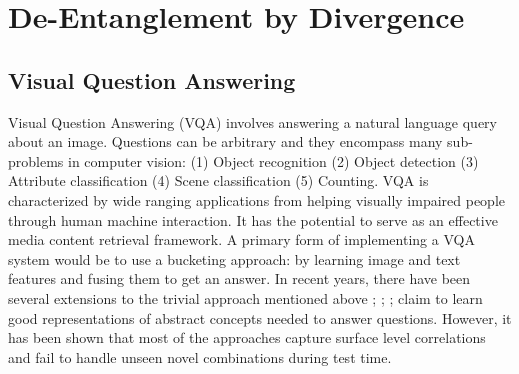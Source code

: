 \chapter{De-Entanglement by Divergence}

\section{Visual Question Answering}

Visual Question Answering (VQA) involves answering a natural language query about an image. Questions can be arbitrary and they encompass many sub-problems in computer vision: (1) Object recognition %
(2) Object detection %
(3) Attribute classification %
(4) Scene classification %
(5) Counting. %
VQA is characterized by wide ranging applications from helping visually impaired people through human machine interaction. It has the potential to serve as an effective media content retrieval framework. 
A primary form of implementing a VQA system would be to use a bucketing approach: by learning image and text features and fusing them to get an answer. In recent years, there have been several extensions to the trivial approach mentioned above \cite{fukui2016multimodal}; \cite{lu2016hierarchical}; \cite{yang2016stacked}; \cite{lu2015deeper} claim to learn good representations of abstract concepts needed to answer questions. However, it has been shown \cite{agrawal2017c} that most of the approaches capture surface level correlations and fail to handle unseen novel combinations during test time. 

